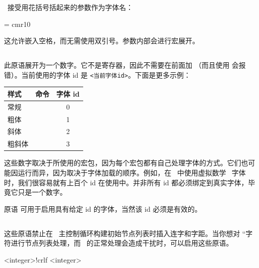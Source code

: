 
\LUATEX\ 接受用花括号括起来的参数作为字体名：

\begin{typing}
\font\myfont = {cmr10}
\end{typing}

这允许嵌入空格，而无需使用双引号。参数内部会进行宏展开。

\subsection{}

\begin{typing}
\fontid\font
\end{typing}

此原语展开为一个数字。它不是寄存器，因此不需要在前面加 （而且使用  会报错）。当前使用的字体 id 是 \texttt{<当前字体id>}。下面是更多示例：

\begin{longtable}{l c c}
\toprule 样式 & 命令 & 字体 id \\
\midrule
常规      & \type {\rmfamily} & 0 \\
粗体      & \type {\bf} & 1 \\
斜体      & \type {\it} & 2 \\
粗斜体    & \type{\bfseries\itshape} & 3 \\
\bottomrule
\end{longtable}

这些数字取决于所使用的宏包，因为每个宏包都有自己处理字体的方式。它们也可能因运行而异，因为取决于字体加载的顺序。例如，在 \CONTEXT\ 中使用虚拟数学 \UNICODE\ 字体时，我们很容易就有上百个 id 在使用中。并非所有 id 都必须绑定到真实字体，毕竟它只是一个数字。

原语  可用于启用具有给定 id 的字体，当然该 id 必须是有效的。

\subsection{}


这些原语禁止在 \LUATEX\ 主控制循环构建初始节点列表时插入连字和字距。当你想对 ``字符进行节点列表处理，而 \TEX\ 的正常处理会造成干扰时，可以启用这些原语。

\begin{typing}
\noligs <integer>!crlf
\nokerns <integer>
\end{typing}

